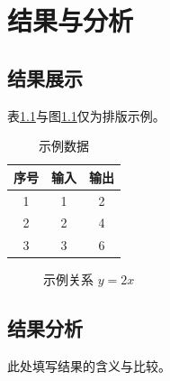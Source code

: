 \chapter{结果与分析}
\label{chap:results}

\section{结果展示}
表\ref{tab:example}与图\ref{fig:example}仅为排版示例。
\begin{table}[htbp]
  \centering
  \caption{示例数据}\label{tab:example}
  \begin{tabular}{ccc}
    \toprule
    序号 & 输入 & 输出 \\
    \midrule
    1 & 1 & 2 \\
    2 & 2 & 4 \\
    3 & 3 & 6 \\
    \bottomrule
  \end{tabular}
\end{table}

\begin{figure}[htbp]
  \centering
  \caption{示例关系 \(y=2x\)}\label{fig:example}
\end{figure}

\section{结果分析}
此处填写结果的含义与比较。
